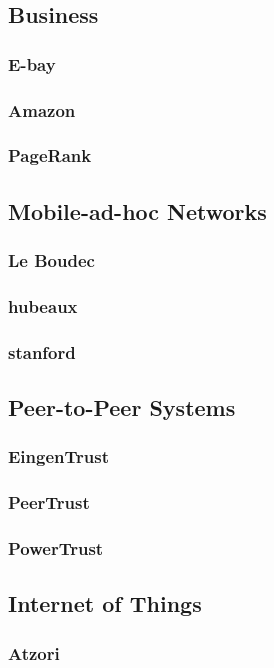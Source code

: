 \subsection{Business}

\subsubsection{E-bay}

\subsubsection{Amazon}

\subsubsection{PageRank}

\subsection{Mobile-ad-hoc Networks}

\subsubsection{Le Boudec}

\subsubsection{hubeaux}

\subsubsection{stanford}

\subsection{Peer-to-Peer Systems}

\subsubsection{EingenTrust}

\subsubsection{PeerTrust}

\subsubsection{PowerTrust}

\subsection{Internet of Things}

\subsubsection{Atzori}


